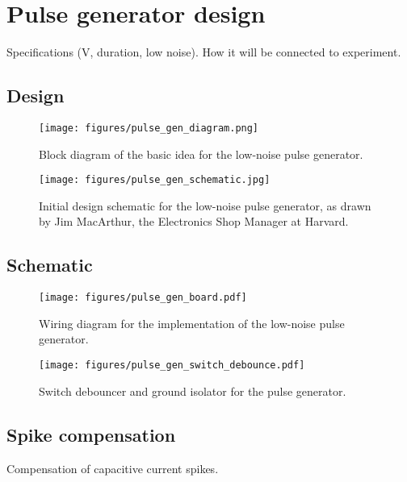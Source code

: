 \chapter{Pulse generator design}
\label{pulse_generator}

Specifications (V, duration, low noise).  How it will be connected to experiment.

\section{Design}

\begin{figure}[h]
\begin{centering}
\texttt{[image: figures/pulse\_gen\_diagram.png]}
\caption[Pulse generator: block diagram]{Block diagram of the basic idea for the low-noise pulse generator.}
\label{fig:pulse_gen_diagram}
\end{centering}
\end{figure}

\begin{figure}[h]
\begin{centering}
\texttt{[image: figures/pulse\_gen\_schematic.jpg]}
\caption[Pulse generator: schematic]{Initial design schematic for the low-noise pulse generator, as drawn by Jim MacArthur, the Electronics Shop Manager at Harvard.}
\label{fig:pulse_gen_schematic}
\end{centering}
\end{figure}

\section{Schematic}

\begin{figure}[h]
\begin{centering}
\texttt{[image: figures/pulse\_gen\_board.pdf]}
\caption[Pulse generator: circuit wiring diagram]{Wiring diagram for the implementation of the low-noise pulse generator.}
\label{fig:pulse_gen}
\end{centering}
\end{figure}

\begin{figure}[h]
\begin{centering}
\texttt{[image: figures/pulse\_gen\_switch\_debounce.pdf]}
\caption[Pulse generator: switch debouncer]{Switch debouncer and ground isolator for the pulse generator.}
\label{fig:pulse_gen_debounce}
\end{centering}
\end{figure}

\section{Spike compensation}

Compensation of capacitive current spikes.